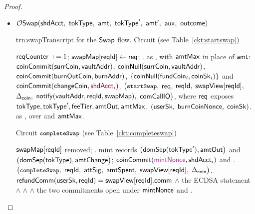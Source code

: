 \begin{proof}
\begin{itemize} [label=$\blacksquare$]
\begin{itemize}
\item $\OSw(\shdAcct\bc \tokType\bc \amt\bc \tokTypeB\bc \amtB\bc \auxx\bc \outc)$
\begin{TxtBox}{trn:swap}{Transcript for the $\mathsf{Swap}$ flow.}
 Circuit \upd{$\cktStartSwap$} (see Table~\ref{ckt:startswap})
\begin{OutList}
\oitem{\Dvault} $\mathsf{reqCounter} \mathrel{+}= 1$; \; $\mathsf{swapMap}[\mathsf{reqId}] \gets \mathsf{req}$; \;
  .
\oitem{\Dshd} as , with $\mathsf{amtMax}$ in place of $\mathsf{amt}$: \;
  \bluedot $\mathsf{coinCommit}(\mathsf{surrCoin}, \mathsf{vaultAddr})$, \; \bluedot $\mathsf{coinNull}(\mathsf{surrCoin}, \mathsf{vaultAddr})$, \;
  \bluedot $\mathsf{coinCommit}(\mathsf{burnOutCoin}, \mathsf{burnAddr})$, \;
  \bluedot $\{\mathsf{coinNull}(\mathsf{fundCoin}_i, \mathsf{coinSk}_i)\}$ and $\coinCommit(\coinChange, \secret{\srcAcct_i})$.
\oitem{\stmt} $\bigl(\texttt{\small startSwap},$ $\mathsf{req},$ $\mathsf{reqId},$ $\mathsf{swapView}[\mathsf{reqId}],$ $\Delta_{\mathsf{coin}},$
  $\mathsf{notify}(\mathsf{vaultAddr}, \mathsf{reqId}, \mathsf{swapMap}),$ $\mathsf{comCallIO}\bigr)$, where $\mathsf{req}$ exposes
  $\mathsf{tokType}, \mathsf{tokType}', \mathsf{feeTier}, \mathsf{amtOut}, \mathsf{amtMax}$.
\oitem{\wit} $(\mathsf{userSk},\; \mathsf{burnCoinNonce},\; \mathsf{coinSk})$.
\oitem{\Rel} as , over \upd{$\swapView$} and $\mathsf{amtMax}$.
\end{OutList}

\vspace{5pt}
Circuit $\texttt{\small completeSwap}$ (see Table~\ref{ckt:completeswap})
\begin{OutList}
\oitem{\Dvault} $\mathsf{swapMap}[\mathsf{reqId}]$ removed; .
\oitem{\Dshd} \bluedot mint records $\bigl(\mathsf{domSep}(\mathsf{tokType}'), \mathsf{amtOut}\bigr)$ and
  $\bigl(\mathsf{domSep}(\mathsf{tokType}), \mathsf{amtChange}\bigr)$; \;
  \bluedot $\coinCommit(\freshrn{\mintNonce}, \shdAcct_i)$ and
  .
\oitem{\stmt} $\bigl(\texttt{\small completeSwap},\; \mathsf{reqId},\; \mathsf{attSig},\; \mathsf{amtSpent},\;
  \mathsf{swapView}[\mathsf{reqId}],\; \Delta_{\mathsf{coin}}\bigr)$.
\oitem{\Rel} $\mathsf{refundComm}(\mathsf{userSk}, \mathsf{reqId}) = \mathsf{swapView}[\mathsf{reqId}].\mathsf{comm}$
  \;$\wedge$\; the ECDSA statement \;$\wedge$\; \upd{$\changeNonce \neq \mintNonce$}
  \;$\wedge$\; \upd{$\amtIn \leq \amtMax$} \;$\wedge$\; the two commitments open under
  $\mathsf{mintNonce}$ and \upd{$\changeNonce$}.
\end{OutList}


\end{TxtBox}
\end{itemize}
\end{itemize}
\end{proof}

